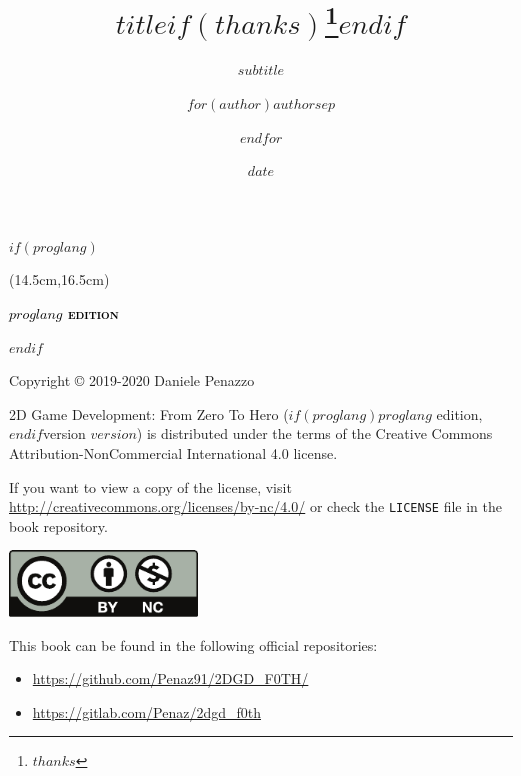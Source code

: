 \documentclass{article}
\title{$title$$if(thanks)$\thanks{$thanks$}$endif$}
\subtitle{$subtitle$}
\author{$for(author)$$author$$sep$ \and $endfor$}
\institute{$for(institute)$$institute$$sep$ \and $endfor$}
\date{$date$}
\begin{document}
\pagestyle{empty}
\begin{titlepage}
    \BgThispage
    $if(proglang)$
    \begin{textblock*}{5cm}(14.5cm,16.5cm) %
        \begin{center}
            \textcolor{black}{\Large\textbf{\textsc{$proglang$ edition}}}
        \end{center}
    \end{textblock*}
    $endif$
    \null
    \newpage
\end{titlepage}

\clearpage
\null
Copyright © 2019-2020 Daniele Penazzo\\

\vspace{12pt}

2D Game Development: From Zero To Hero ($if(proglang)$$proglang$ edition, $endif$version $version$) is distributed under the terms of the Creative Commons Attribution-NonCommercial International 4.0 license.\\

\vspace{12pt}

If you want to view a copy of the license, visit \url{http://creativecommons.org/licenses/by-nc/4.0/} or check the \texttt{LICENSE} file in the book repository.

\vspace{24pt}

\includegraphics[width=50mm]{images/by-nc.pdf}

This book can be found in the following official repositories:

\begin{itemize}
    \item \url{https://github.com/Penaz91/2DGD_F0TH/}
    \item \url{https://gitlab.com/Penaz/2dgd_f0th}
\end{itemize}
\end{document}
